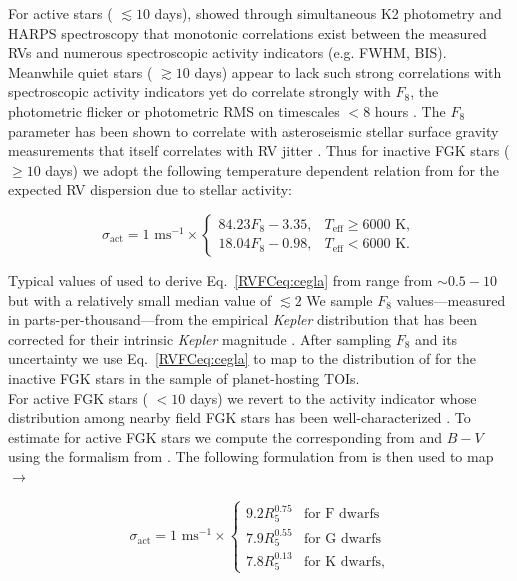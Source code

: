 For active stars
(\prot{} $\lesssim 10$ days), \cite{oshagh17} showed through simultaneous
K2 photometry and HARPS spectroscopy that monotonic correlations exist between the measured RVs and numerous
spectroscopic activity indicators (e.g. \Rhk{,} FWHM, BIS). Meanwhile quiet stars
(\prot{} $\gtrsim 10$ days) appear to lack such strong
correlations with spectroscopic activity indicators yet do correlate strongly with $F_8$, the photometric
flicker or photometric RMS on timescales $<8$ hours \citep{bastien13}. The $F_8$ parameter has been shown to
correlate with asteroseismic stellar surface gravity measurements \citep{bastien13} that itself correlates
with RV jitter \citep{bastien14}. Thus for inactive FGK stars (\prot{} $\geq 10$ days)
we adopt the following temperature dependent
relation from \cite{cegla14} for the expected RV dispersion due to stellar activity:

\begin{equation}
  \sigma_{\text{act}} = 1 \text{ m} \text{s}^{-1} \times
  \begin{cases}
    84.23 F_8 - 3.35, & T_{\text{eff}} \geq 6000 \text{ K}, \\
    18.04 F_8 - 0.98, & T_{\text{eff}} < 6000 \text{ K}.
  \end{cases} \label{RVFCeq:cegla}
\end{equation}

\noindent Typical values of \sigact{} used to derive Eq.~\ref{RVFCeq:cegla} from \cite{saar03} range from
$\sim 0.5-10$ \mps{} but with a relatively small median value of $\lesssim 2$ 
We sample $F_8$ values---measured in parts-per-thousand---from the empirical \emph{Kepler} distribution
that has been corrected for their intrinsic \emph{Kepler} magnitude \citep{bastien13}. After sampling $F_8$ and its
uncertainty we use Eq.~\ref{RVFCeq:cegla} to map to the distribution of \sigact{} for the inactive FGK stars in
the sample of planet-hosting TOIs. \\

For active FGK stars (\prot{} $<10$ days) we revert to the \Rhk{} activity indicator \citep{noyes84} 
whose distribution among nearby field FGK stars
has been well-characterized \citep{henry96, santos00, wright04, hall07, isaacson10, lovis11}. To estimate \sigact{}
for active FGK stars we compute the corresponding \Rhk{} from \prot{} and $B-V$ using the formalism from
\cite{noyes84}. The following formulation from \cite{santos00} is then used to map \Rhk{} $\to$ \sigact{:}

\begin{equation}
  \sigma_{\text{act}} = 1 \text{ m} \text{s}^{-1} \times
  \begin{cases}
    9.2 R_5^{0.75} & \text{for F dwarfs} \\
    7.9 R_5^{0.55} & \text{for G dwarfs} \\
    7.8 R_5^{0.13} & \text{for K dwarfs},
  \end{cases} \label{RVFCeq:santos}
\end{equation}  

